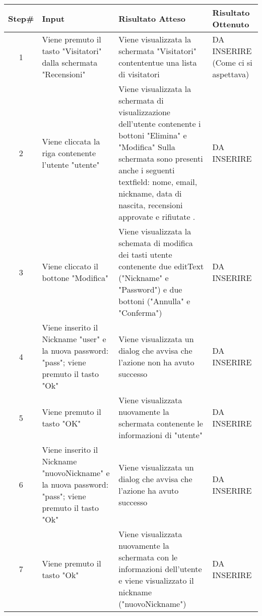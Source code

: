 \begin{table}[H]
    \footnotesize
    \begin{tabularx}{\textwidth}{|c|X|X|X|}
        \hline
        Step\# & Input & Risultato Atteso & Risultato Ottenuto \\
        \hline
         1 & Viene premuto il tasto "Visitatori" dalla schermata "Recensioni" 
         & Viene visualizzata la schermata "Visitatori" contententue una lista di visitatori
         &DA INSERIRE (Come ci si aspettava)\\
          \hline
        2 & Viene cliccata la riga contenente l'utente "utente"
        & Viene visualizzata la schermata di visualizzazione dell'utente contenente i bottoni "Elimina" e "Modifica"
          Sulla schermata sono presenti anche i seguenti textfield: nome, email, nickname, data di nascita, recensioni approvate e rifiutate .
        & DA INSERIRE\\
         \hline 
        3 & Viene cliccato il bottone "Modifica"
         & Viene visualizzata la schemata di modifica dei tasti utente contenente due editText ("Nickname" e "Password") e
         due bottoni ("Annulla" e "Conferma")
         & DA INSERIRE\\
          \hline
        4 & Viene inserito il Nickname "user" e la nuova password: "pass"; viene premuto il tasto "Ok"
         & Viene visualizzata un dialog che avvisa che l'azione non ha avuto successo
         & DA INSERIRE\\
          \hline  
          5 & Viene premuto il tasto "OK"
          & Viene visualizzata nuovamente la schermata contenente le informazioni di "utente"
          & DA INSERIRE\\
          \hline      
        6 & Viene inserito il Nickname "nuovoNickname" e la nuova password: "pass"; viene premuto il tasto "Ok"
         & Viene visualizzata un dialog che avvisa che l'azione ha avuto successo
         & DA INSERIRE\\
           \hline 
           7 & Viene premuto il tasto "Ok"
           & Viene visualizzata nuovamente la schermata con le informazioni dell'utente e
           viene visualizzato il nickname ("nuovoNickname")
           & DA INSERIRE\\
             \hline                       
    \end{tabularx}
\end{table}
    
       
